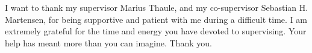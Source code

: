 I want to thank my supervisor Marius Thaule, and my co-supervisor Sebastian H. Martensen, for being supportive and patient with me during a difficult time. I am extremely grateful for the time and energy you have devoted to supervising. Your help has meant more than you can imagine. Thank you.